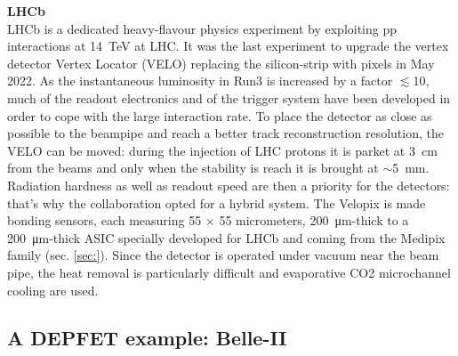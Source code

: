         \vspace{5mm}
        \textbf{LHCb} \\
        LHCb is a dedicated heavy-flavour physics experiment by exploiting pp interactions at \SI{14}{TeV} at LHC. 
        It was the last experiment to upgrade the vertex detector Vertex Locator (VELO) replacing the silicon-strip with pixels in May 2022. 
        As the instantaneous luminosity in Run3 is increased by a factor $\lesssim$10, much of the readout electronics and of the trigger system have been developed in order to cope with the large interaction rate.
        To place the detector as close as possible to the beampipe and reach a better track reconstruction resolution, the VELO can be moved: during the injection of LHC protons it is parket at \SI{3}{cm} from the beams and only when the stability is reach it is brought at $\sim$\SI{5}{mm}. Radiation hardness as well as readout speed are then a priority for the detectors: that's why the collaboration opted for a hybrid system. 
        The Velopix is made bonding sensors, each measuring 55 $\times$ 55 micrometers, \SI{200}{\um}-thick to a \SI{200}{\um}-thick ASIC specially developed for LHCb and coming from the Medipix family (sec. \ref{sec:}).
        Since the detector is operated under vacuum near the beam pipe, the heat removal is particularly difficult and evaporative CO2 microchannel cooling are used. 
    \subsection{A DEPFET example: Belle-II}
        

